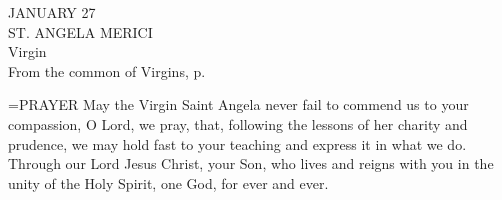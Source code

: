 \begin{center}\normalsize JANUARY 27\\
\footnotesize ST. ANGELA MERICI\\
\footnotesize Virgin\\
\footnotesize From the common of Virgins, p. \\
\end{center}

\hangindent=\parindent \small{PRAYER 
May the Virgin Saint Angela never fail to commend us
to your compassion, O Lord, we pray,
that, following the lessons of her charity and prudence,
we may hold fast to your teaching
and express it in what we do.
Through our Lord Jesus Christ, your Son,
who lives and reigns with you in the unity of the Holy Spirit,
one God, for ever and ever.
 \\}
 
